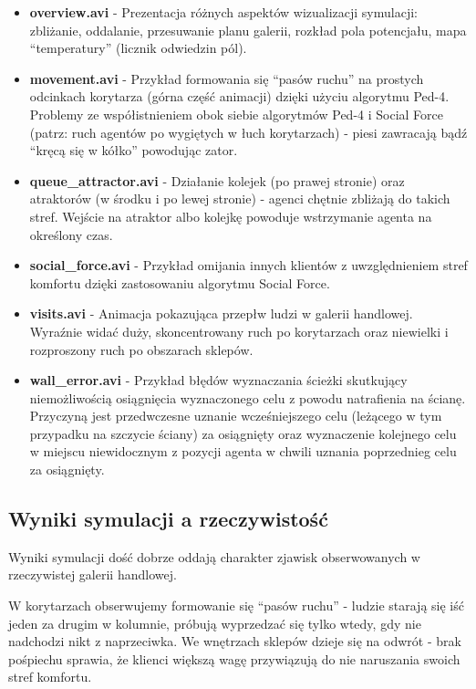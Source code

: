 \documentclass[a4paper, 12pt]{article}
\begin{document}
        \begin{itemize}
          \item \textbf{overview.avi} - Prezentacja różnych aspektów wizualizacji symulacji: zbliżanie, oddalanie, przesuwanie planu galerii, rozkład pola potencjału, mapa ``temperatury'' (licznik odwiedzin pól).

          \item \textbf{movement.avi} - Przykład formowania się ``pasów ruchu'' na prostych odcinkach korytarza (górna część animacji) dzięki użyciu algorytmu Ped-4. Problemy ze współistnieniem obok siebie algorytmów Ped-4 i Social Force (patrz: ruch agentów po wygiętych w łuch korytarzach) - piesi zawracają bądź ``kręcą się w kółko'' powodując zator.

          \item \textbf{queue\_attractor.avi} - Działanie kolejek (po prawej stronie) oraz atraktorów (w środku i po lewej stronie) - agenci chętnie zbliżają do takich stref. Wejście na atraktor albo kolejkę powoduje wstrzymanie agenta na określony czas.

          \item \textbf{social\_force.avi} - Przykład omijania innych klientów z uwzględnieniem stref komfortu dzięki zastosowaniu algorytmu Social Force.

          \item \textbf{visits.avi} - Animacja pokazująca przepłw ludzi w galerii handlowej. Wyraźnie widać duży, skoncentrowany ruch po korytarzach oraz niewielki i rozproszony ruch po obszarach sklepów.

          \item \textbf{wall\_error.avi} - Przykład błędów wyznaczania ścieżki skutkujący niemożliwością osiągnięcia wyznaczonego celu z powodu natrafienia na ścianę. Przyczyną jest przedwczesne uznanie wcześniejszego celu (leżącego w tym przypadku na szczycie ściany) za osiągnięty oraz wyznaczenie kolejnego celu w miejscu niewidocznym z pozycji agenta w chwili uznania poprzednieg celu za osiągnięty.
        \end{itemize}

        \subsection{Wyniki symulacji a rzeczywistość}
        \label{sec:sim-vs-reality}
Wyniki symulacji dość dobrze oddają charakter zjawisk obserwowanych w rzeczywistej galerii handlowej.

W korytarzach obserwujemy formowanie się ``pasów ruchu'' - ludzie starają się iść jeden za drugim w kolumnie, próbują wyprzedzać się tylko wtedy, gdy nie nadchodzi nikt z naprzeciwka. We wnętrzach sklepów dzieje się na odwrót - brak pośpiechu sprawia, że klienci większą wagę przywiązują do nie naruszania swoich stref komfortu.
\end{document}
